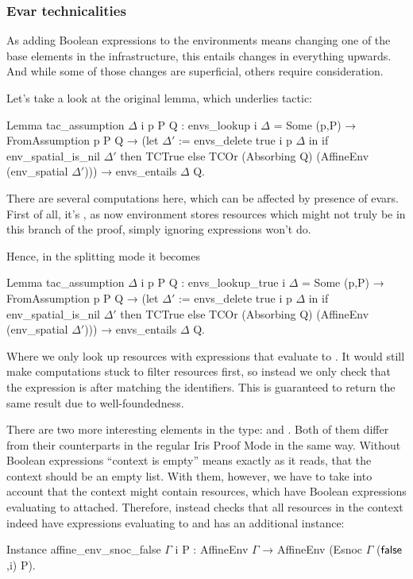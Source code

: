 \subsubsection{Evar technicalities}
\label{subsubsec:evar_technicalities}

As adding Boolean expressions to the environments means changing one of the base elements in the infrastructure, this entails changes in everything upwards.
And while some of those changes are superficial, others require consideration.

Let's take a look at the original  lemma, which underlies  tactic:
\begin{coq}
  Lemma tac_assumption $\Delta$ i p P Q :
  envs_lookup i $\Delta$ = Some (p,P) →
  FromAssumption p P Q →
  (let $\Delta'$ := envs_delete true i p $\Delta$ in
   if env_spatial_is_nil $\Delta'$ then TCTrue
   else TCOr (Absorbing Q) (AffineEnv (env_spatial $\Delta'$))) →
  envs_entails $\Delta$ Q.
\end{coq}

There are several computations here, which can be affected by presence of evars.
First of all, it's , as now environment stores resources which might not truly be in this branch of the proof, simply ignoring expressions won't do.

Hence, in the splitting mode it becomes
\begin{coq}
Lemma tac_assumption $\Delta$ i p P Q :
  envs_lookup_true i $\Delta$ = Some (p,P) →
  FromAssumption p P Q →
  (let $\Delta'$ := envs_delete true i p $\Delta$ in
   if env_spatial_is_nil $\Delta'$ then TCTrue
   else TCOr (Absorbing Q) (AffineEnv (env_spatial $\Delta'$))) →
  envs_entails $\Delta$ Q.
\end{coq}

Where we only look up resources with expressions that evaluate to \true.
It would still make computations stuck to filter resources first, so instead we only check that the expression is \true after matching the identifiers.
This is guaranteed to return the same result due to well-foundedness.

There are two more interesting elements in the type:  and .
Both of them differ from their counterparts in the regular Iris Proof Mode in the same way.
Without Boolean expressions ``context is empty'' means exactly as it reads, that the context should be an empty list.
With them, however, we have to take into account that the context might contain resources, which have Boolean expressions evaluating to \false attached.
Therefore,  instead checks that all resources in the context indeed have expressions evaluating to \false and  has an additional instance:
\begin{coq}
  Instance affine_env_snoc_false $\Gamma$ i P :
  AffineEnv $\Gamma$ → AffineEnv (Esnoc $\Gamma$ ($\textsf{false}$,i) P).
\end{coq}


